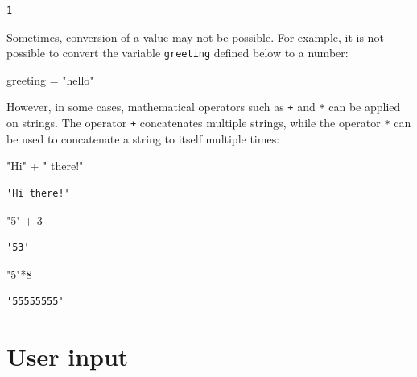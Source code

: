 \documentclass[
  letterpaper,
  DIV=11,
  numbers=noendperiod]{scrreprt}
\newenvironment{Shaded}{\begin{snugshade}}{\end{snugshade}}
\newcommand{\CommentTok}[1]{\textcolor[rgb]{0.37,0.37,0.37}{#1}}
\newcommand{\DecValTok}[1]{\textcolor[rgb]{0.68,0.00,0.00}{#1}}
\newcommand{\NormalTok}[1]{\textcolor[rgb]{0.00,0.23,0.31}{#1}}
\newcommand{\OperatorTok}[1]{\textcolor[rgb]{0.37,0.37,0.37}{#1}}
\newcommand{\StringTok}[1]{\textcolor[rgb]{0.13,0.47,0.30}{#1}}
\begin{document}
\begin{verbatim}
1
\end{verbatim}

Sometimes, conversion of a value may not be possible. For example, it is
not possible to convert the variable \texttt{greeting} defined below to
a number:

\begin{Shaded}
\begin{Highlighting}[]
\NormalTok{greeting }\OperatorTok{=} \StringTok{"hello"}
\end{Highlighting}
\end{Shaded}

However, in some cases, mathematical operators such as \texttt{+} and
\texttt{*} can be applied on strings. The operator \texttt{+}
concatenates multiple strings, while the operator \texttt{*} can be used
to concatenate a string to itself multiple times:

\begin{Shaded}
\begin{Highlighting}[]
\CommentTok{"Hi"} \OperatorTok{+} \StringTok{" there!"}
\end{Highlighting}
\end{Shaded}

\begin{verbatim}
'Hi there!'
\end{verbatim}

\begin{Shaded}
\begin{Highlighting}[]
\CommentTok{"5"} \OperatorTok{+} \StringTok{\textquotesingle{}3\textquotesingle{}}
\end{Highlighting}
\end{Shaded}

\begin{verbatim}
'53'
\end{verbatim}

\begin{Shaded}
\begin{Highlighting}[]
\CommentTok{"5"}\OperatorTok{*}\DecValTok{8}
\end{Highlighting}
\end{Shaded}

\begin{verbatim}
'55555555'
\end{verbatim}

\hypertarget{user-input}{%
\section{User input}\label{user-input}}
\end{document}
